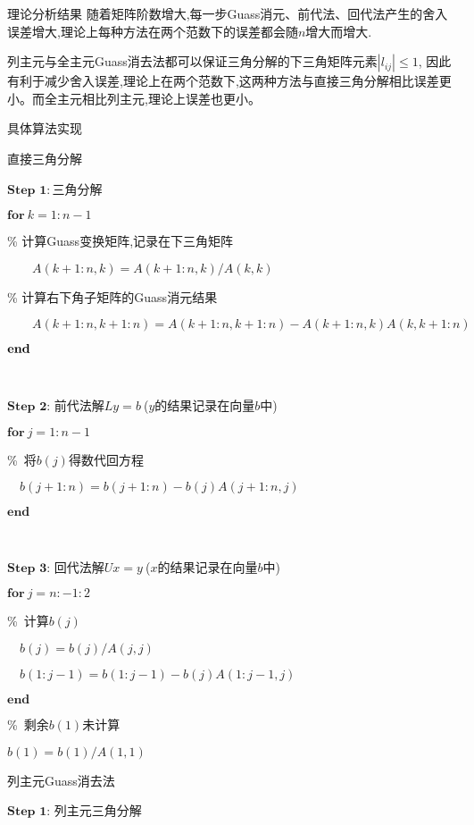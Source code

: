 \documentclass{article}
\begin{document}
\begin{section}{理论分析结果}
    随着矩阵阶数增大,每一步Guass消元、前代法、回代法产生的舍入误差增大,理论上每种方法在两个范数下的误差都会随$n$增大而增大.

    列主元与全主元Guass消去法都可以保证三角分解的下三角矩阵元素$\left\lvert l_{ij}\right\rvert \leq 1 $,
    因此有利于减少舍入误差,理论上在两个范数下,这两种方法与直接三角分解相比误差更小。而全主元相比列主元,理论上误差也更小。

\end{section}
\begin{section}{具体算法实现}
    \begin{subsection}{直接三角分解}
        \small{
            \noindent $\textbf{Step\ 1}:$三角分解

        $ \textbf{for}\ k=1:n-1$ 

        \% 计算Guass变换矩阵,记录在下三角矩阵

        $\qquad A(k+1:n,k) = A(k+1:n,k)/A(k,k)$
         
        \% 计算右下角子矩阵的Guass消元结果

        $\qquad A(k+1:n,k+1:n) = A(k+1:n,k+1:n) - A(k+1:n,k)A(k,k+1:n)$

        $\bf{end}$

        \

        \noindent$\textbf{Step\ 2:}$ 前代法解$Ly=b\ $($y$的结果记录在向量$b$中)

        $\textbf{for}\ j=1:n-1$

        \%\ 将$b(j)$得数代回方程

        $\quad b(j+1:n) = b(j+1:n)-b(j)A(j+1:n,j)$

        $\textbf{end}$

\

        \noindent$\textbf{Step\ 3:}$ 回代法解$Ux=y\ $($x$的结果记录在向量$b$中)

        $\textbf{for}\  j=n:-1:2$

        \%\ 计算$b(j)$

        $\quad b(j) = b(j)/A(j,j)$

        $\quad b(1:j-1) = b(1:j-1)-b(j)A(1:j-1,j)$

        $\textbf{end}$

        \%\ 剩余$b(1)$未计算

        $b(1) = b(1)/A(1,1)$ }
        
    \end{subsection}
    \begin{subsection}{列主元Guass消去法}
        \small{
    \noindent$\textbf{Step\ 1:}$ 列主元三角分解
        
}
\end{subsection}
\end{section}
\end{document}
